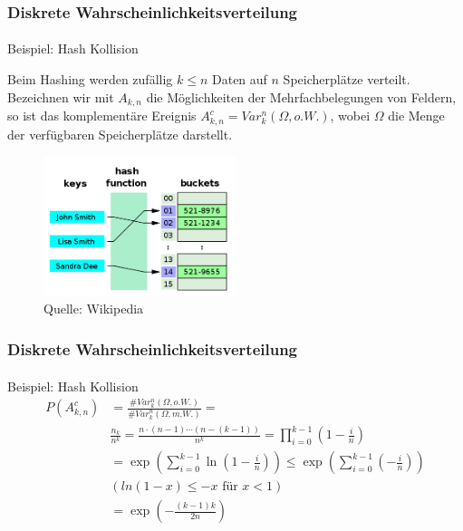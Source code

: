 \documentclass{beamer}
\begin{document}
\begin{frame}
    \frametitle{Diskrete Wahrscheinlichkeitsverteilung}
\framesubtitle{}

\begin{block}{Beispiel: Hash Kollision}

Beim Hashing werden zufällig $k \leq n$ Daten auf $n$ Speicherplätze  verteilt. Bezeichnen wir mit $A_{k,n}$ die Möglichkeiten der Mehrfachbelegungen von Feldern, so ist das komplementäre Ereignis
$A^c_{k,n} = Var^n_k(\Omega, o.W.)$,  wobei $\Omega$ die Menge der verfügbaren Speicherplätze darstellt. 
\end{block}


\begin{figure}[htp]
      \centering
    \includegraphics[width=0.5\textwidth]{img/hashtable}

      \caption{Quelle: Wikipedia}
\end{figure}


 \end{frame}


\begin{frame}
    \frametitle{Diskrete Wahrscheinlichkeitsverteilung}
\framesubtitle{}

\begin{block}{Beispiel: Hash Kollision}
\begin{align*}
 P(A^c_{k,n} ) & = \frac{\# Var^n_k(\Omega, o.W.)}{ \# Var^n_k(\Omega, m.W.)} = \\
 & \frac{n_k}{n^k} = \frac{n \cdot (n-1) \cdots (n-(k -1))}{n^k} = \prod_{i=0}^{k-1} (1- \frac{i}{n}) \\
& = \exp (\sum_{i=0}^{k-1} \ln {(1- \frac{i}{n})}) \leq  \exp (\sum_{i=0}^{k-1} (- \frac{i}{n})) \\
 & (ln(1-x) \leq -x \text{ für } x < 1) \\
&= \exp(- \frac{(k-1)k } {2n})
\end{align*}
\end{block}



 \end{frame}
\end{document}
